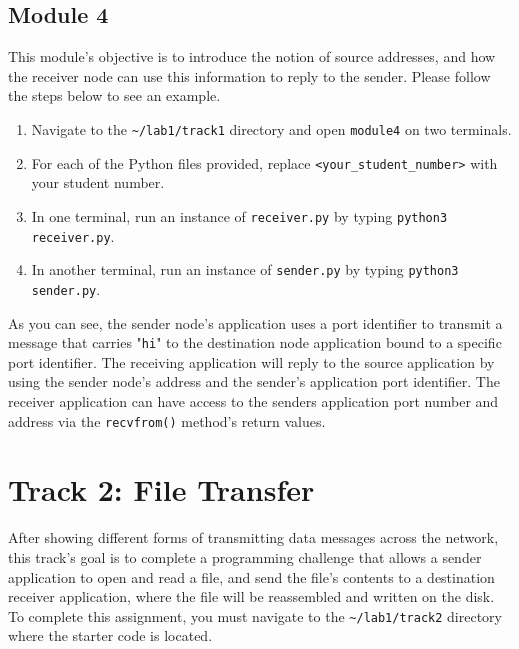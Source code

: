 \documentclass[11pt]{article}
\begin{document}


\subsection{Module 4}
\label{subsec:module4}
This module's objective is to introduce the notion of source addresses, and how the receiver node can use this information to reply to the sender.
Please follow the steps below to see an example.


\begin{enumerate}
    \item Navigate to the \texttt{\textasciitilde/lab1/track1} directory and open \texttt{module4} on two terminals.
    \item For each of the Python files provided, replace \texttt{<your\_student\_number>} with your student number.
    \item In one terminal, run an instance of \texttt{receiver.py} by typing \texttt{python3 receiver.py}.
    \item In another terminal, run an instance of \texttt{sender.py} by typing \texttt{python3 sender.py}.
\end{enumerate}

As you can see, the sender node's application uses a port identifier to transmit a message that carries "\texttt{hi}" to the destination node application bound to a specific port identifier.
The receiving application will reply to the source application by using the sender node's address and the sender's application port identifier.
The receiver application can have access to the senders application port number and address via the \texttt{recvfrom()} method's return values.

\section{Track 2: File Transfer}
\label{sec:track2}
After showing different forms of transmitting data messages across the network, this track's goal is to complete a programming challenge that allows a sender application to open and read a file, and send the file's contents to a destination receiver application, where the file will be reassembled and written on the disk.
To complete this assignment, you must navigate to the \texttt{\textasciitilde/lab1/track2} directory where the starter code is located.
\end{document}
